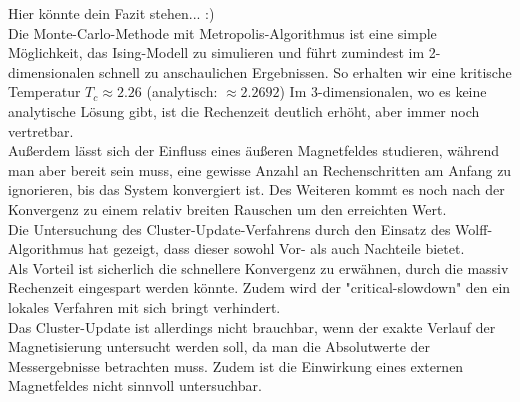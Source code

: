 Hier könnte dein Fazit stehen... :)\\
Die Monte-Carlo-Methode mit Metropolis-Algorithmus ist eine simple Möglichkeit, das Ising-Modell zu simulieren und führt zumindest im 2-dimensionalen schnell zu anschaulichen Ergebnissen. So erhalten wir eine kritische Temperatur $ T_c \approx 2.26 $ (analytisch: $\approx 2.2692$) Im 3-dimensionalen, wo es keine analytische Lösung gibt, ist die Rechenzeit deutlich erhöht, aber immer noch vertretbar.\\
Außerdem lässt sich der Einfluss eines äußeren Magnetfeldes studieren, während man aber bereit sein muss, eine gewisse Anzahl an Rechenschritten am Anfang zu ignorieren, bis das System konvergiert ist. Des Weiteren kommt es noch nach der Konvergenz zu einem relativ breiten Rauschen um den erreichten Wert.\\
Die Untersuchung des Cluster-Update-Verfahrens durch den Einsatz des Wolff-Algorithmus hat gezeigt, dass dieser sowohl Vor- als auch Nachteile bietet.\\
Als Vorteil ist sicherlich die schnellere Konvergenz zu erwähnen, durch die massiv Rechenzeit eingespart werden könnte. Zudem wird der "critical-slowdown" den ein lokales Verfahren mit sich bringt verhindert.\\
Das Cluster-Update ist allerdings nicht brauchbar, wenn der exakte Verlauf der Magnetisierung untersucht werden soll, da man die Absolutwerte der Messergebnisse betrachten muss. Zudem ist die Einwirkung eines externen Magnetfeldes nicht sinnvoll untersuchbar.
 

